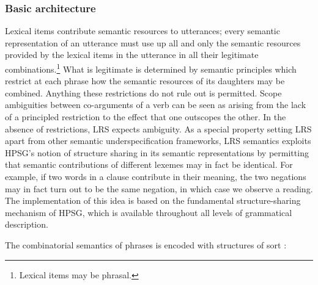 \documentclass[output=paper
 	        ,biblatex
                ,babelshorthands
                ,newtxmath
                ,draftmode
                ,colorlinks, citecolor=brown
]{langscibook}
\begin{document}
\subsubsection{Basic architecture}
\label{semantics:sec-basic-architecture}

Lexical items contribute semantic resources to utterances; every semantic representation of an utterance must use up all and only the semantic resources provided by the lexical items in the utterance in all their legitimate combinations.\footnote{Lexical items may be phrasal.} What is legitimate is determined by semantic principles which restrict at each phrase how the semantic resources of its daughters may be combined. Anything these restrictions do not rule out is permitted. Scope ambiguities between co-arguments of a verb can be seen as arising from the lack of a principled restriction to the effect that one outscopes the other. In the absence of restrictions, LRS expects ambiguity. As a special property setting LRS apart from other semantic underspecification frameworks, LRS semantics exploits HPSG's notion of structure sharing in its semantic representations by permitting that semantic contributions of different lexemes may in fact be identical. For example, if two words in a clause contribute  in their meaning, the two negations may in fact turn out to be the same negation, in which case we observe a  reading. The implementation of this idea is based on the fundamental structure-sharing mechanism of HPSG, which is available throughout all levels of grammatical description.

The combinatorial semantics of phrases is encoded with structures of sort :


\begin{exe}
  \ex\label{lrs-str}
\end{exe}
\end{document}
